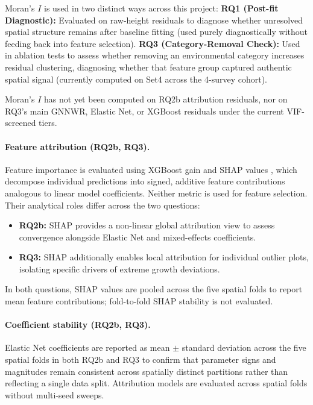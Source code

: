 \documentclass[11pt,a4paper]{report}
\begin{document}
Moran's $I$ is used in two distinct ways across this project: \textbf{RQ1 (Post-fit Diagnostic):} Evaluated on raw-height residuals to diagnose whether unresolved spatial structure remains after baseline fitting (used purely diagnostically without feeding back into feature selection). \textbf{RQ3 (Category-Removal Check):} Used in ablation tests to assess whether removing an environmental category increases residual clustering, diagnosing whether that feature group captured authentic spatial signal (currently computed on Set4 across the 4-survey cohort).

Moran's $I$ has not yet been computed on RQ2b attribution residuals, nor on RQ3's main GNNWR, Elastic Net, or XGBoost residuals under the current VIF-screened tiers. %

\paragraph*{Feature attribution (RQ2b, RQ3).}
Feature importance is evaluated using XGBoost gain and SHAP values \citep{lundberg2017unified}, which decompose individual predictions into signed, additive feature contributions analogous to linear model coefficients. Neither metric is used for feature selection. Their analytical roles differ across the two questions:
\begin{itemize}
  \item \textbf{RQ2b:} SHAP provides a non-linear global attribution view to assess convergence alongside Elastic Net and mixed-effects coefficients.
  \item \textbf{RQ3:} SHAP additionally enables local attribution for individual outlier plots, isolating specific drivers of extreme growth deviations.
\end{itemize}
In both questions, SHAP values are pooled across the five spatial folds to report mean feature contributions; fold-to-fold SHAP stability is not evaluated.

\paragraph*{Coefficient stability (RQ2b, RQ3).}
Elastic Net coefficients are reported as mean $\pm$ standard deviation across the five spatial folds in both RQ2b and RQ3 to confirm that parameter signs and magnitudes remain consistent across spatially distinct partitions rather than reflecting a single data split. Attribution models are evaluated across spatial folds without multi-seed sweeps.
\end{document}
